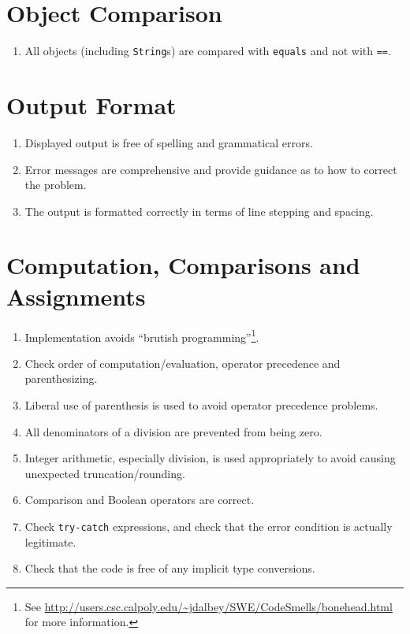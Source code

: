 \documentclass{scrreprt}
\begin{document}
\begin{appendix}
\section*{Object Comparison}\begin{enumerate}[resume]
\item All objects (including \texttt{String}s) are compared with \texttt{equals} and not with \texttt{==}.
\end{enumerate}

\section*{Output Format}\begin{enumerate}[resume]
\item Displayed output is free of spelling and grammatical errors.
\item Error messages are comprehensive and provide guidance as to how to correct the problem.
\item The output is formatted correctly in terms of line stepping and spacing.
\end{enumerate}

\section*{Computation, Comparisons and Assignments}\begin{enumerate}[resume]
\item Implementation avoids “brutish programming”\footnote{See \url{http://users.csc.calpoly.edu/~jdalbey/SWE/CodeSmells/bonehead.html} for more information.}. 
\item Check order of computation/evaluation, operator precedence and parenthesizing.
\item Liberal use of parenthesis is used to avoid operator precedence problems.
\item All denominators of a division are prevented from being zero.
\item Integer arithmetic, especially division, is used appropriately to avoid causing unexpected truncation/rounding.
\item Comparison and Boolean operators are correct.
\item Check \texttt{try-catch} expressions, and check that the error condition is actually legitimate.
\item Check that the code is free of any implicit type conversions.
\end{enumerate}


\end{appendix}
\end{document}
